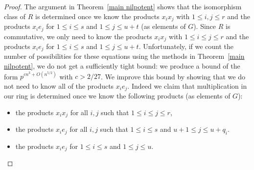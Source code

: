 \documentclass[12pt]{article}
\begin{document}
\begin{proof}
The argument in Theorem~\ref{main nilpotent} shows that the isomorphism class of $R$ is determined once we know the products $x_ix_j$ with $1\leq i,j\leq r$ and the products $x_ie_j$ for $1\leq i\leq s$ and $1\leq j\leq u+t$ (as elements of $G$). Since $R$ is commutative, we only need to know the products $x_ix_j$ with $1\leq i\leq j\leq r$ and the products $x_ie_j$ for $1\leq i\leq s$ and $1\leq j\leq u+t$. Unfortunately, if we count the number of possibilities for these equations using the methods in Theorem~\ref{main nilpotent}, we do not get a sufficiently tight bound: we produce a bound of the form $p^{c n^3+O(n^{5/2})}$ with $c>2/27$. We improve this bound by showing that we do not need to know all of the products $x_ie_j$. Indeed we claim that multiplication in our ring is determined once we know the following products (as elements of $G$):

\begin{itemize}
\item[(i)] the products $x_ix_{j}$  for all $i, j$ such that $1 \leq i \leq j \leq r$,
\item[(ii)] the products $x_{i}e_{j}$ for all $i, j$ such that $1 \leq i \leq s$ and $u +1\leq j \leq u + q_i$.
\item[(iii)] the products $x_{i}e_{j}$ for  $1 \leq i \leq s$ and $1 \leq j \leq u$.
\end{itemize}


\end{proof}
\end{document}
